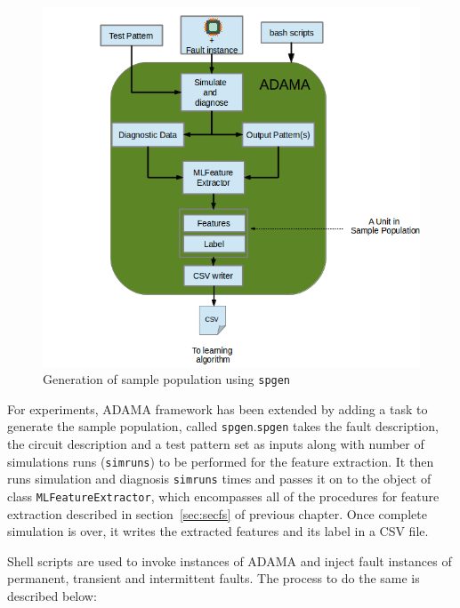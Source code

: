 \begin{figure}[h]
  \begin{center}
    \captionsetup{justification=centering}
    \includegraphics[scale=0.45]{figures/sampopl.png}
    \caption{Generation of sample population using \texttt{spgen}}
    \label{fig:sampopl}
  \end{center}
\end{figure}

For experiments, ADAMA framework has been extended by adding a task to generate the sample population, called \texttt{spgen}.\texttt{spgen} takes the fault description, the circuit description and a test pattern set as inputs along with number of simulations runs (\texttt{simruns}) to be performed for the feature extraction. It then runs simulation and diagnosis \texttt{simruns} times and passes it on to the object of class \texttt{MLFeatureExtractor}, which encompasses all of the procedures for feature extraction described in section~\ref{sec:secfs} of previous chapter. Once complete simulation is over, it writes the extracted features and its label in a CSV file.

Shell scripts are used to invoke instances of ADAMA and inject fault instances of permanent, transient and intermittent faults. The process to do the same is described below:

